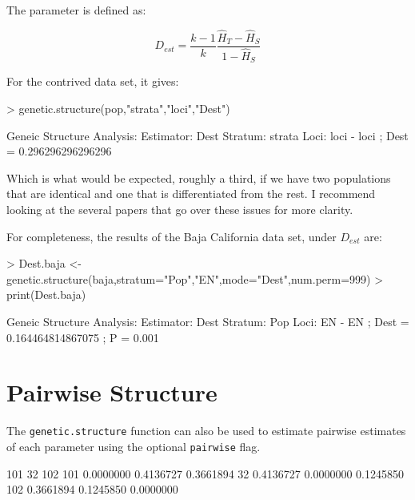 \documentclass[letterpaper,twoside,openany]{book}
\begin{document}
The parameter is defined as:

\[
D_{est} = \frac{k-1}{k} \frac{\hat{H}_T - \hat{H}_S}{1-\hat{H}_S}
\]

For the contrived data set, it gives:

\begin{Schunk}
\begin{Sinput}
> genetic.structure(pop,"strata","loci","Dest")
\end{Sinput}
\begin{Soutput}
Geneic Structure Analysis:
  Estimator: Dest 
  Stratum: strata 
  Loci: { loci }
   - loci ;  Dest = 0.296296296296296 
\end{Soutput}
\end{Schunk}

Which is what would be expected, roughly a third, if we have two populations that are identical and one that is differentiated from the rest.  I recommend looking at the several papers that go over these issues for more clarity.

For completeness, the results of the Baja California data set, under $D_{est}$ are:

\begin{Schunk}
\begin{Sinput}
> Dest.baja <- genetic.structure(baja,stratum="Pop","EN",mode="Dest",num.perm=999)
> print(Dest.baja)
\end{Sinput}
\begin{Soutput}
Geneic Structure Analysis:
  Estimator: Dest 
  Stratum: Pop 
  Loci: { EN }
   - EN ;  Dest = 0.164464814867075 ; P = 0.001 
\end{Soutput}
\end{Schunk}

\section{Pairwise Structure}

The \texttt{genetic.structure} function can also be used to estimate pairwise estimates of each parameter using the optional \texttt{pairwise} flag.  

\begin{Schunk}
\begin{Soutput}
          101        32       102
101 0.0000000 0.4136727 0.3661894
32  0.4136727 0.0000000 0.1245850
102 0.3661894 0.1245850 0.0000000
\end{Soutput}
\end{Schunk}
%
%
\end{document}
